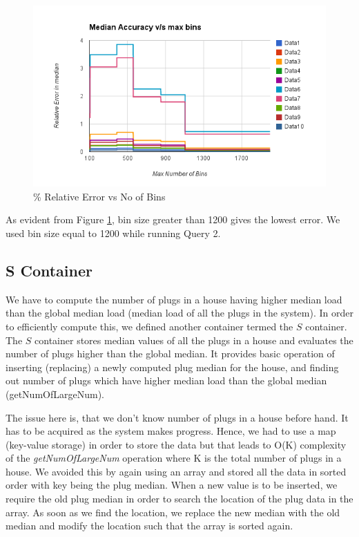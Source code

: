 \begin{figure}[h]
\begin{center}
\includegraphics[scale=0.5]{img/bin_size_experiment}
\vspace*{-0.4cm}
\caption{\% Relative Error vs No of Bins \label{fig:binsize}}
\end{center}
\end{figure}

As evident from Figure \ref{fig:binsize}, bin size greater than 1200 gives the lowest error. We used bin size equal to 1200 while running Query 2.

\subsection{S Container}
We have to compute the number of plugs in a house having higher median load than the global median load (median load of all the plugs in the system). In order to efficiently compute this, we defined another container termed the $S$ container. The $S$ container stores median values of all the plugs in a house and evaluates the number of plugs higher than the global median. It provides basic operation of inserting (replacing) a newly computed plug median for the house, and finding out number of plugs which have higher median load than the global median (getNumOfLargeNum).

The issue here is, that we don't know number of plugs in a house before hand. It has to be acquired as the system makes progress. Hence, we had to use a map (key-value storage) in order to store the data but that leads to O(K) complexity of the \textit{getNumOfLargeNum} operation where K is the total number of plugs in a house. We avoided this by again using an array and stored all the data in sorted order with key being the plug median. When a new value is to be inserted, we require the old plug median in order to search the location of the plug data in the array. As soon as we find the location, we replace the new median with the old median and modify the location such that the array is sorted again.

